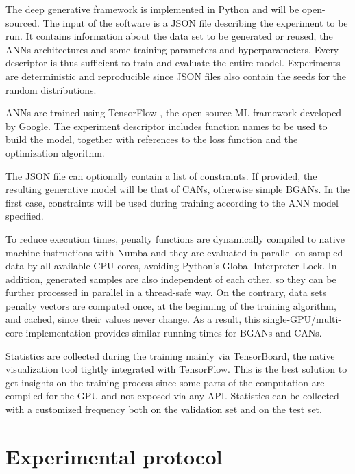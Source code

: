 The deep generative framework is implemented in Python and will be open-sourced. The input of the software is a JSON file describing the experiment to be run. It contains information about the data set to be generated or reused, the ANNs architectures and some training parameters and hyperparameters. Every descriptor is thus sufficient to train and evaluate the entire model. Experiments are deterministic and reproducible since JSON files also contain the seeds for the random distributions.

ANNs are trained using TensorFlow \cite{tensorflow}, the open-source ML framework developed by Google. The experiment descriptor includes function names to be used to build the model, together with references to the loss function and the optimization algorithm.

The JSON file can optionally contain a list of constraints. If provided, the resulting generative model will be that of CANs, otherwise simple BGANs. In the first case, constraints will be used during training according to the ANN model specified.

To reduce execution times, penalty functions are dynamically compiled to native machine instructions with Numba \cite{numba}   and they are evaluated in parallel on sampled data by all available CPU cores, avoiding Python's Global Interpreter Lock. In addition, generated samples are also independent of each other, so they can be further processed in parallel in a thread-safe way. On the contrary, data sets penalty vectors are computed once, at the beginning of the training algorithm, and cached, since their values never change. As a result, this single-GPU/multi-core implementation provides similar running times for BGANs and CANs.

Statistics are collected during the training mainly via TensorBoard, the native visualization tool tightly integrated with TensorFlow. This is the best solution to get insights on the training process since some parts of the computation are compiled for the GPU and not exposed via any API. Statistics can be collected with a customized frequency both on the validation set and on the test set.


\section{Experimental protocol}



